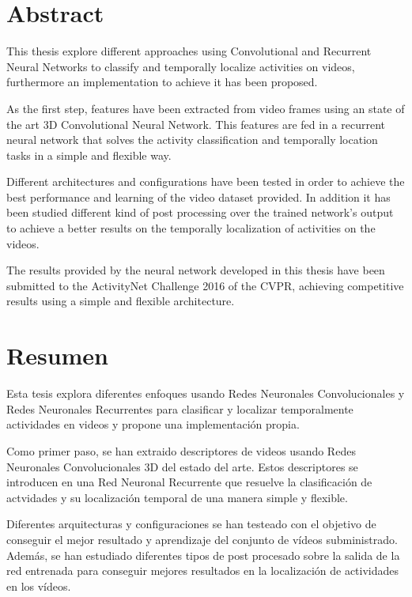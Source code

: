 \chapter*{Abstract}

This thesis explore different approaches using Convolutional and Recurrent Neural Networks to classify and temporally localize activities on videos, furthermore an implementation to achieve it has been proposed.

As the first step, features have been extracted from video frames using an state of the art 3D Convolutional Neural Network. This features are fed in a recurrent neural network that solves the activity classification and temporally location tasks in a simple and flexible way.

Different architectures and configurations have been tested in order to achieve the best performance and learning of the video dataset provided. In addition it has been studied different kind of post processing over the trained network's output to achieve a better results on the temporally localization of activities on the videos.

The results provided by the neural network developed in this thesis have been submitted to the ActivityNet Challenge 2016 of the CVPR, achieving competitive results using a simple and flexible architecture.

\chapter*{Resumen}

Esta tesis explora diferentes enfoques usando Redes Neuronales Convolucionales y Redes Neuronales Recurrentes para clasificar y localizar temporalmente actividades en videos y propone una implementación propia.

Como primer paso, se han extraido descriptores de videos usando Redes Neuronales Convolucionales 3D del estado del arte. Estos descriptores se introducen en una Red Neuronal Recurrente que resuelve la clasificación de actvidades y su localización temporal de una manera simple y flexible.

Diferentes arquitecturas y configuraciones se han testeado con el objetivo de conseguir el mejor resultado y aprendizaje del conjunto de vídeos subministrado. Además, se han estudiado diferentes tipos de post procesado sobre la salida de la red entrenada para conseguir mejores resultados en la localización de actividades en los vídeos.


